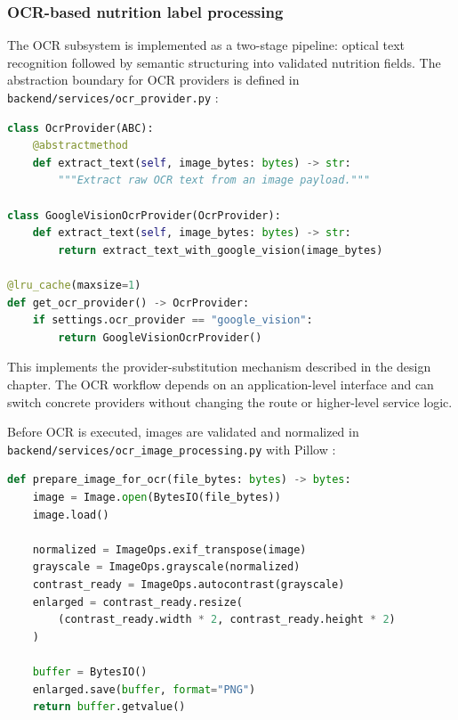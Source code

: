 \subsubsection{OCR-based nutrition label processing}

The OCR subsystem is implemented as a two-stage pipeline: optical text
recognition followed by semantic structuring into validated nutrition
fields. The abstraction boundary for OCR providers is defined in
\texttt{backend/services/ocr\_provider.py}
\cite{google2026vision}:

\begin{lstlisting}[language=Python,caption={OCR provider strategy in \texttt{backend/services/ocr\_provider.py}},label={lst:ocr-provider}]
class OcrProvider(ABC):
    @abstractmethod
    def extract_text(self, image_bytes: bytes) -> str:
        """Extract raw OCR text from an image payload."""

class GoogleVisionOcrProvider(OcrProvider):
    def extract_text(self, image_bytes: bytes) -> str:
        return extract_text_with_google_vision(image_bytes)

@lru_cache(maxsize=1)
def get_ocr_provider() -> OcrProvider:
    if settings.ocr_provider == "google_vision":
        return GoogleVisionOcrProvider()
\end{lstlisting}

This implements the provider-substitution mechanism described in the
design chapter. The OCR workflow depends on an application-level
interface and can switch concrete providers without changing the route
or higher-level service logic.

Before OCR is executed, images are validated and normalized in
\texttt{backend/services/ocr\_image\_processing.py} with Pillow
\cite{pillow2026docs}:

\begin{lstlisting}[language=Python,caption={Image preprocessing for OCR},label={lst:ocr-preprocess}]
def prepare_image_for_ocr(file_bytes: bytes) -> bytes:
    image = Image.open(BytesIO(file_bytes))
    image.load()

    normalized = ImageOps.exif_transpose(image)
    grayscale = ImageOps.grayscale(normalized)
    contrast_ready = ImageOps.autocontrast(grayscale)
    enlarged = contrast_ready.resize(
        (contrast_ready.width * 2, contrast_ready.height * 2)
    )

    buffer = BytesIO()
    enlarged.save(buffer, format="PNG")
    return buffer.getvalue()
\end{lstlisting}

